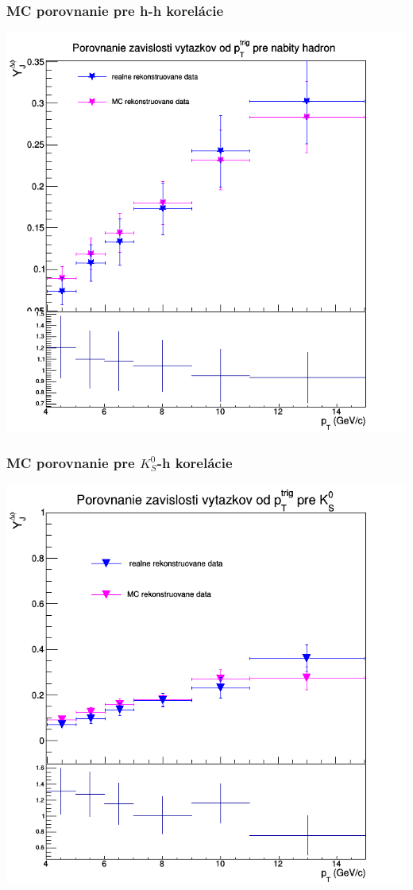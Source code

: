 \documentclass{beamer}
\begin{document}
	\begin{frame}
	\frametitle{MC porovnanie pre h-h korelácie}
		\centering \includegraphics[scale=0.3]{../Obrazky_praca/Vytazok_porovnanieMCh.png}
	
	\end{frame}

\begin{frame}
\frametitle{MC porovnanie pre $K^0_S$-h korelácie}
\centering \includegraphics[scale=0.3]{../Obrazky_praca/Vytazok_porovnanieMC.png}

\end{frame}
\end{document}
